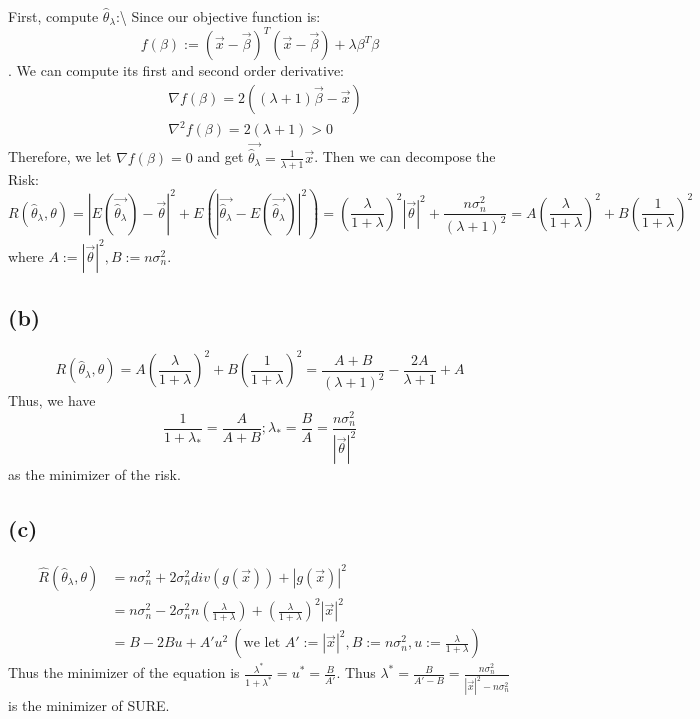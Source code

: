 \documentclass[]{article}
\begin{document}
First, compute \(\hat{\theta}_{\lambda}\):\textbackslash{} Since our
objective function is:
\[ f(\beta) := (\vec{x} - \vec{\beta})^T (\vec{x} - \vec{\beta}) + \lambda \beta ^T \beta    \].
We can compute its first and second order derivative: \[
\begin{equation*}
\begin{aligned}
& \nabla f(\beta) = 2((\lambda+1)\vec{\beta} - \vec{x})\\
& \nabla^2f(\beta) = 2(\lambda+1) > 0
\end{aligned}
\end{equation*}
\] Therefore, we let \(\nabla f(\beta) = 0\) and get
\(\vec{\hat{\theta}_\lambda} = \frac{1}{\lambda + 1} \vec{x}\). Then we
can decompose the Risk:
\[R(\hat{\theta}_\lambda, \theta) = |E(\vec{\hat{\theta}_\lambda}) - \vec{\theta}|^2 + E(|\vec{\hat{\theta}_\lambda} - E(\vec{\hat{\theta}_\lambda})|^2) = (\frac{\lambda}{1+\lambda})^2 |\vec{\theta}|^2 + \frac{n \sigma_n^2}{(\lambda+1)^2} = A (\frac{\lambda}{1+\lambda})^2 + B(\frac{1}{1+\lambda})^2   \]
where \(A := |\vec{\theta}|^2, B:= n\sigma_n^2\).

\subsection{(b)}\label{b}

\[ R(\hat{\theta}_\lambda, \theta) = A (\frac{\lambda}{1+\lambda})^2 + B(\frac{1}{1+\lambda})^2 = \frac{A+B}{(\lambda+1)^2} - \frac{2A}{\lambda+1} + A\]
Thus, we have
\[ \frac{1}{1+\lambda_*} = \frac{A}{A+B}; \lambda_* = \frac{B}{A} = \frac{n\sigma_n^2}{|\vec{\theta}|^2}\]
as the minimizer of the risk.

\subsection{(c)}\label{c}

\[
\begin{equation*}
\begin{aligned}
\hat{R}(\hat{\theta}_\lambda, \theta) & = n\sigma_n^2 + 2\sigma_n^2 div(g(\vec{x})) + |g(\vec{x})|^2 \\
& = n\sigma_n^2 - 2\sigma_n^2 n (\frac{\lambda}{1+\lambda}) + (\frac{\lambda}{1+\lambda})^2|\vec{x}|^2\\
& = B - 2Bu + A'u^2 \ (\text{we let } A' := |\vec{x}|^2, B := n\sigma_n^2, u:= \frac{\lambda}{1+\lambda})
\end{aligned}
\end{equation*}
\] Thus the minimizer of the equation is
\(\frac{\lambda^*}{1+\lambda^*} = u^* = \frac{B}{A'}\). Thus
\(\lambda^* = \frac{B}{A'-B} = \frac{n\sigma_n^2}{|\vec{x}|^2 -n\sigma_n^2 }\)
is the minimizer of SURE.
\end{document}
